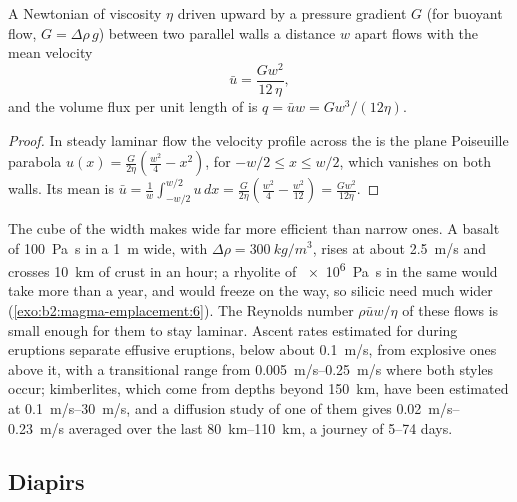 \begin{proposition}\label{prop:b2:magma-emplacement:poiseuille}
A Newtonian  of viscosity $\eta$ driven upward by a pressure gradient $G$
(for buoyant flow, $G = \Delta\rho\,g$) between two parallel walls a distance $w$
apart flows with the mean velocity
\[
\bar u = \frac{G w^2}{12\,\eta},
\]
and the volume flux per unit length of  is $q = \bar u w = G w^3/(12\eta)$.
\end{proposition}

\begin{proof}
In steady laminar flow the velocity profile across the  is the plane
Poiseuille parabola $u(x) = \frac{G}{2\eta}\left(\frac{w^2}{4} - x^2\right)$, for
$-w/2 \le x \le w/2$, which vanishes on both walls. Its mean is
$\bar u = \frac1w\int_{-w/2}^{w/2}u\,dx = \frac{G}{2\eta}\left(\frac{w^2}{4} -
\frac{w^2}{12}\right) = \frac{Gw^2}{12\eta}$.
\end{proof}

The cube of the width makes wide  far more efficient than narrow ones. A
basalt of \qty{100}{Pa.s} in a  \qty{1}{m} wide, with $\Delta\rho =
\qty{300}{kg/m^3}$, rises at about \qty{2.5}{m/s} and crosses \qty{10}{km} of
crust in an hour; a rhyolite of \qty{e6}{Pa.s} in the same  would take more
than a year, and would freeze on the way, so silicic  need much wider
 (\cref{exo:b2:magma-emplacement:6}). The Reynolds number $\rho\bar u w/\eta$ of these flows
is small enough for them to stay laminar. Ascent rates estimated for 
during eruptions separate effusive eruptions, below about \qty{0.1}{m/s}, from
explosive ones above it, with a transitional range from \qtyrange{0.005}{0.25}{m/s}
where both styles occur; kimberlites, which come from
depths beyond \qty{150}{km}, have been estimated at \qtyrange{0.1}{30}{m/s}, and
a diffusion study of one of them gives \qtyrange{0.02}{0.23}{m/s} averaged over
the last \qtyrange{80}{110}{km}, a journey of \numrange{5}{74} days.

\subsection{Diapirs}

